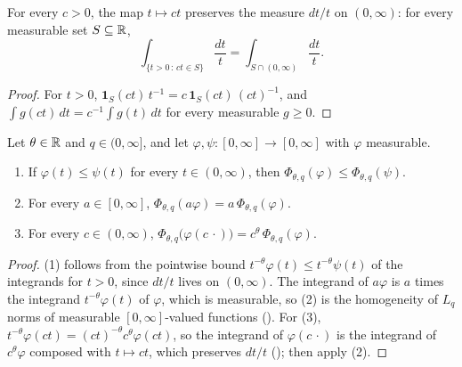 \begin{lemma}
\label{lem:dilation-invariance}
\leanok
{}
For every $c > 0$, the map $t \mapsto ct$ preserves the measure $dt/t$ on $(0, \infty)$: for
every measurable set $S \subseteq \mathbb{R}$,
\[
  \int_{\{t > 0 \,:\, ct \in S\}} \frac{dt}{t} = \int_{S \cap (0, \infty)} \frac{dt}{t} .
\]
\end{lemma}

\begin{proof}
\leanok
For $t > 0$, $\mathbf{1}_S(ct) \, t^{-1} = c \, \mathbf{1}_S(ct) \, (ct)^{-1}$, and
$\int g(ct) \, dt = c^{-1} \int g(t) \, dt$ for every measurable $g \geq 0$.
\end{proof}

\begin{lemma}
\label{lem:phi-functional-dilation}
\leanok
{}
Let $\theta \in \mathbb{R}$ and $q \in (0, \infty]$, and let $\varphi, \psi : [0, \infty] \to [0, \infty]$
with $\varphi$ measurable.
\begin{enumerate}
  \item If $\varphi(t) \leq \psi(t)$ for every $t \in (0, \infty)$, then
    $\Phi_{\theta, q}(\varphi) \leq \Phi_{\theta, q}(\psi)$.
  \item For every $a \in [0, \infty]$,
    $\Phi_{\theta, q}(a \varphi) = a \, \Phi_{\theta, q}(\varphi)$.
  \item For every $c \in (0, \infty)$,
    $\Phi_{\theta, q}\bigl(\varphi(c \, \cdot)\bigr) = c^{\theta} \, \Phi_{\theta, q}(\varphi)$.
\end{enumerate}
\end{lemma}

\begin{proof}
\leanok
(1) follows from the pointwise bound $t^{-\theta} \varphi(t) \leq t^{-\theta} \psi(t)$ of the
integrands for $t > 0$, since $dt/t$ lives on $(0, \infty)$. The integrand of $a \varphi$ is
$a$ times the integrand $t^{-\theta} \varphi(t)$ of $\varphi$, which is measurable, so (2) is the
homogeneity of $L_q$ norms of measurable $[0, \infty]$-valued functions
(). For (3),
$t^{-\theta} \varphi(ct) = (ct)^{-\theta} c^{\theta} \varphi(ct)$, so the integrand of
$\varphi(c \, \cdot)$ is the integrand of $c^{\theta} \varphi$ composed with $t \mapsto ct$,
which preserves $dt/t$ (); then apply (2).
\end{proof}

